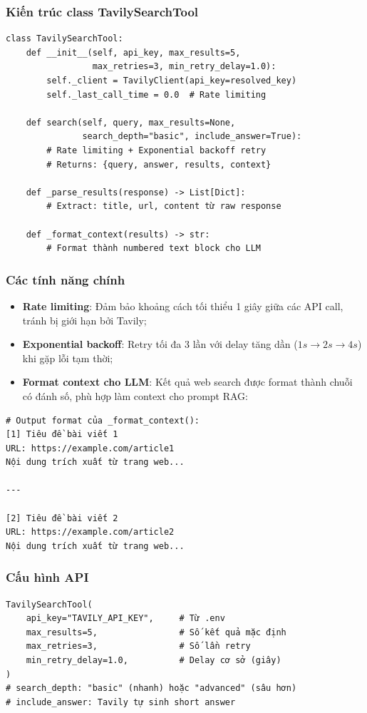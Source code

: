 \documentclass[../DoAn.tex]{subfiles}
\begin{document}
\subsubsection{Kiến trúc class TavilySearchTool}
\begin{verbatim}
class TavilySearchTool:
    def __init__(self, api_key, max_results=5,
                 max_retries=3, min_retry_delay=1.0):
        self._client = TavilyClient(api_key=resolved_key)
        self._last_call_time = 0.0  # Rate limiting

    def search(self, query, max_results=None,
               search_depth="basic", include_answer=True):
        # Rate limiting + Exponential backoff retry
        # Returns: {query, answer, results, context}

    def _parse_results(response) -> List[Dict]:
        # Extract: title, url, content từ raw response

    def _format_context(results) -> str:
        # Format thành numbered text block cho LLM
\end{verbatim}

\subsubsection{Các tính năng chính}
\begin{itemize}
    \item \textbf{Rate limiting}: Đảm bảo khoảng cách tối thiểu 1 giây giữa các API call, tránh bị giới hạn bởi Tavily;
    \item \textbf{Exponential backoff}: Retry tối đa 3 lần với delay tăng dần ($1s \rightarrow 2s \rightarrow 4s$) khi gặp lỗi tạm thời;
    \item \textbf{Format context cho LLM}: Kết quả web search được format thành chuỗi có đánh số, phù hợp làm context cho prompt RAG:
\end{itemize}

\begin{verbatim}
# Output format của _format_context():
[1] Tiêu đề bài viết 1
URL: https://example.com/article1
Nội dung trích xuất từ trang web...

---

[2] Tiêu đề bài viết 2
URL: https://example.com/article2
Nội dung trích xuất từ trang web...
\end{verbatim}

\subsubsection{Cấu hình API}
\begin{verbatim}
TavilySearchTool(
    api_key="TAVILY_API_KEY",     # Từ .env
    max_results=5,                # Số kết quả mặc định
    max_retries=3,                # Số lần retry
    min_retry_delay=1.0,          # Delay cơ sở (giây)
)
# search_depth: "basic" (nhanh) hoặc "advanced" (sâu hơn)
# include_answer: Tavily tự sinh short answer
\end{verbatim}
\end{document}
